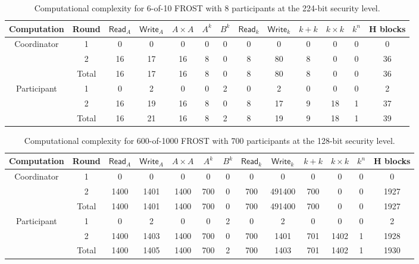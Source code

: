 \begin{table}
	\centering
	\begin{tabular}{c c c c c c c c c c c c c}
		\toprule
		Computation & Round & $\mathsf{Read}_A$ & $\mathsf{Write}_A$ & $A \times A$ & $A^k$  & $B^k$  & $\mathsf{Read}_k$ & $\mathsf{Write}_k$ & $k + k$ & $k \times k$ & $k^n$ & H blocks \\ \midrule
		Coordinator & 1 & 0 & 0 & 0 & 0 & 0 & 0 & 0 & 0 & 0 & 0 & 0 \\
		            & 2 & 16 & 17 & 16 & 8 & 0 & 8 & 80 & 8 & 0 & 0 & 36 \\
		            & Total & 16 & 17 & 16 & 8 & 0 & 8 & 80 & 8 & 0 & 0 & 36 \\
		\midrule
		Participant & 1 & 0 & 2 & 0 & 0 & 2 & 0 & 2 & 0 & 0 & 0 & 2 \\
		            & 2 & 16 & 19 & 16 & 8 & 0 & 8 & 17 & 9 & 18 & 1 & 37 \\
		            & Total & 16 & 21 & 16 & 8 & 2 & 8 & 19 & 9 & 18 & 1 & 39 \\
		\bottomrule
	\end{tabular}
	\caption{Computational complexity for 6-of-10 FROST with 8 participants at the 224-bit security level.}
\end{table}

\begin{table}
	\centering
	\begin{tabular}{c c c c c c c c c c c c c}
		\toprule
		Computation & Round & $\mathsf{Read}_A$ & $\mathsf{Write}_A$ & $A \times A$ & $A^k$  & $B^k$  & $\mathsf{Read}_k$ & $\mathsf{Write}_k$ & $k + k$ & $k \times k$ & $k^n$ & H blocks \\ \midrule
		Coordinator & 1 & 0 & 0 & 0 & 0 & 0 & 0 & 0 & 0 & 0 & 0 & 0 \\
		            & 2 & 1400 & 1401 & 1400 & 700 & 0 & 700 & 491400 & 700 & 0 & 0 & 1927 \\
		            & Total & 1400 & 1401 & 1400 & 700 & 0 & 700 & 491400 & 700 & 0 & 0 & 1927 \\
		\midrule
		Participant & 1 & 0 & 2 & 0 & 0 & 2 & 0 & 2 & 0 & 0 & 0 & 2 \\
		            & 2 & 1400 & 1403 & 1400 & 700 & 0 & 700 & 1401 & 701 & 1402 & 1 & 1928 \\
		            & Total & 1400 & 1405 & 1400 & 700 & 2 & 700 & 1403 & 701 & 1402 & 1 & 1930 \\
		\bottomrule
	\end{tabular}
	\caption{Computational complexity for 600-of-1000 FROST with 700 participants at the 128-bit security level.}
\end{table}
